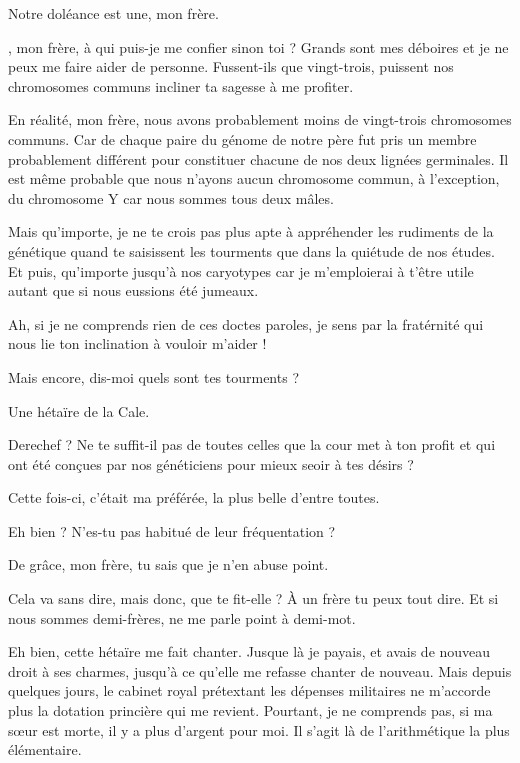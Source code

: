 
\begin{drama}
  \elenaspeaks Notre doléance est une, mon frère.

  \vladimirspeaks \elena, mon frère, à qui puis-je me confier sinon toi ? Grands sont mes déboires et je ne peux me faire aider de personne. Fussent-ils que vingt-trois, puissent nos chromosomes communs incliner ta sagesse à me profiter.

  \elenaspeaks En réalité, mon frère, nous avons probablement moins de vingt-trois chromosomes communs. Car de chaque paire du génome de notre père fut pris un membre probablement différent pour constituer chacune de nos deux lignées germinales. Il est même probable que nous n’ayons aucun chromosome commun, à l’exception, du chromosome Y car nous sommes tous deux mâles.

  Mais qu’importe, je ne te crois pas plus apte à appréhender les rudiments de la génétique quand te saisissent les tourments que dans la quiétude de nos études. Et puis, qu’importe jusqu’à nos caryotypes car je m’emploierai à t’être utile autant que si nous eussions été jumeaux.

  \vladimirspeaks Ah, si je ne comprends rien de ces doctes paroles, je sens par la fratérnité qui nous lie ton inclination à vouloir m’aider !

  \elenaspeaks Mais encore, dis-moi quels sont tes tourments ?

  \vladimirspeaks Une hétaïre de la Cale.

  \elenaspeaks Derechef ? Ne te suffit-il pas de toutes celles que la cour met à ton profit et qui ont été conçues par nos généticiens pour mieux seoir à tes désirs ?

  \vladimirspeaks Cette fois-ci, c’était ma préférée, la plus belle d’entre toutes.

  \elenaspeaks Eh bien ? N’es-tu pas habitué de leur fréquentation ?

  \vladimirspeaks De grâce, mon frère, tu sais que je n’en abuse point.

  \elenaspeaks Cela va sans dire, mais donc, que te fit-elle ? À un frère tu peux tout dire. Et si nous sommes demi-frères, ne me parle point à demi-mot.

  \vladimirspeaks Eh bien, cette hétaïre me fait chanter. Jusque là je payais, et avais de nouveau droit à ses charmes, jusqu’à ce qu’elle me refasse chanter de nouveau. Mais depuis quelques jours, le cabinet royal prétextant les dépenses militaires ne m’accorde plus la dotation princière qui me revient. Pourtant, je ne comprends pas, si ma sœur est morte, il y a plus d’argent pour moi. Il s’agit là de l’arithmétique la plus élémentaire.


\end{drama}

